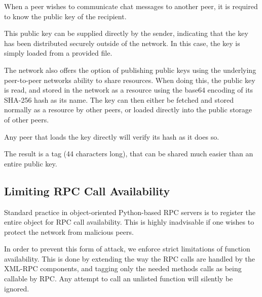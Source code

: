 When a peer wishes to communicate chat messages to another peer, it is required to know the public key of the recipient.

This public key can be supplied directly by the sender, indicating that the key has been distributed securely outside of the network. In this case, the key is simply loaded from a provided file.

The network also offers the option of publishing public keys using the underlying peer-to-peer networks ability to share resources. When doing this, the public key is read, and stored in the network as a resource using the base64 encoding of its SHA-256 hash as its name. The key can then either be fetched and stored normally as a resource by other peers, or loaded directly into the public storage of other peers.

Any peer that loads the key directly will verify its hash as it does so.

The result is a tag (44 characters long), that can be shared much easier than an entire public key.

\subsection{Limiting RPC Call Availability}

Standard practice in object-oriented Python-based RPC servers is to register the entire object for RPC call availability. This is highly inadvisable if one wishes to protect the network from malicious peers.

In order to prevent this form of attack, we enforce strict limitations of function availability. This is done by extending the way the RPC calls are handled by the XML-RPC components, and tagging only the needed methods calls as being callable by RPC. Any attempt to call an unlisted function will silently be ignored.

